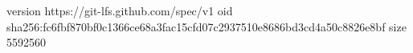 version https://git-lfs.github.com/spec/v1
oid sha256:fc6fbf870bf0c1366ce68a3fac15cfd07c2937510e8686bd3cd4a50c8826e8bf
size 5592560
